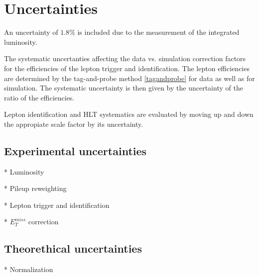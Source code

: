 \section{Uncertainties}

An uncertainty of $1.8\%$ is included due to the measurement of
the integrated luminosity.

The systematic uncertanties affecting the data vs. simulation correction factors
for the efficiencies of the lepton trigger and identification. The lepton
efficiencies are determined by the tag-and-probe method \ref{tagandprobe} for data as well as for
simulation. The systematic uncertainty is then given by the uncertainty of
the ratio of the efficiencies.

Lepton identification and HLT systematics are evaluated by moving up and down
the appropiate scale factor by its uncertainty.

\subsection{Experimental uncertainties}

* Luminosity

* Pileup reweighting

* Lepton trigger and identification

* $E_{T}^{miss}$ correction

\subsection{Theorethical uncertainties}

* Normalization







